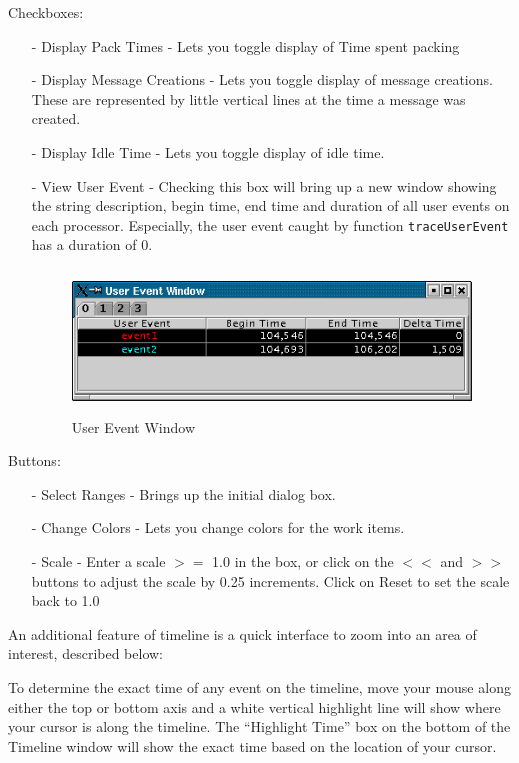 \documentclass[10pt]{article}
\begin{document}
\begin{enumerate}
Checkboxes:
   \begin{itemize}
   \item[-]
   Display Pack Times - Lets you toggle display of Time spent packing
   \item[-] 
   Display Message Creations - Lets you toggle display of message
   creations. These are represented by little vertical lines at the
   time a message was created.
   \item[-]
   Display Idle Time - Lets you toggle display of idle time.
   \item[-]
   View User Event - Checking this box will bring up a new window
   showing the string description, begin time, end time and duration
   of all user events on each processor.  Especially, the user event
   caught by function {\tt traceUserEvent} has a duration of 0.

   \begin{figure}[htb]
   \center
   \includegraphics[height=1.5in]{fig/userevent}
   \caption{User Event Window}
   \label{userevent}
   \end{figure}

   \end{itemize}

Buttons:
   \begin{itemize}
   \item[-]
   Select Ranges - Brings up the initial dialog box.
   \item[-]
   Change Colors - Lets you change colors for the work items.
   \item[-]
   Scale - Enter a scale $>=$ 1.0 in the box, or click on the $<<$ and
   $>>$ buttons to adjust the scale by 0.25 increments.  Click on
   Reset to set the scale back to 1.0
   \end{itemize}
\end{enumerate}

An additional feature of timeline is a quick interface to zoom into an
area of interest, described below:

To determine the exact time of any event on the timeline, move your
mouse along either the top or bottom axis and a white vertical
highlight line will show where your cursor is along the timeline. The
``Highlight Time'' box on the bottom of the Timeline window will show
the exact time based on the location of your cursor.
\end{document}
